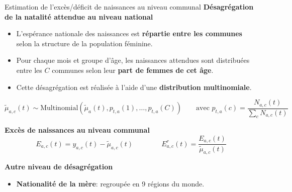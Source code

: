\documentclass[aspectratio=169,9pt]{beamer}
\newcommand{\compresslist}{%
  \setlength{\itemsep}{2pt}%
  \setlength{\parskip}{0pt}%
  \setlength{\parsep}{0pt}%
}
\begin{document}
\begin{frame}{Estimation de l'excès/déficit de naissances au niveau communal}
\textbf{Désagrégation de la natalité attendue au niveau national}

\begin{itemize}\compresslist
\item L'espérance nationale des naissances est \textbf{répartie entre les communes} selon la structure de la population féminine.
\item Pour chaque mois et groupe d'âge, les naissances attendues sont distribuées entre les $C$ communes selon leur \textbf{part de femmes de cet âge}.
\item Cette désagrégation est réalisée à l'aide d'une \textbf{distribution multinomiale}.
\end{itemize}
$$
\tilde{\mu}_{a,c}(t) \sim \mathrm{Multinomial}\left(\tilde{\mu}_{a}(t),p_{t,a}(1),\ldots, p_{t,a}(C)\right) \qquad \text{avec }p_{t,a}(c) = \dfrac{N_{a,c}(t)}{\sum_c N_{a,c}(t)}
$$
\vspace{0.1cm}

\textbf{Excès de naissances au niveau communal}
$$E_{a,c}(t) = y_{a,c}(t) - \tilde{\mu}_{a,c}(t)\qquad\qquad E^r_{a,c}(t) = \dfrac{E_{a,c}(t)}{\tilde{\mu}_{a,c}(t)}$$
\vspace{0.1cm}

\textbf{Autre niveau de désagrégation}
\begin{itemize}\compresslist
\item \textbf{Nationalité de la mère}: regroupée en 9 régions du monde.%
\end{itemize}
\end{frame}
\end{document}
